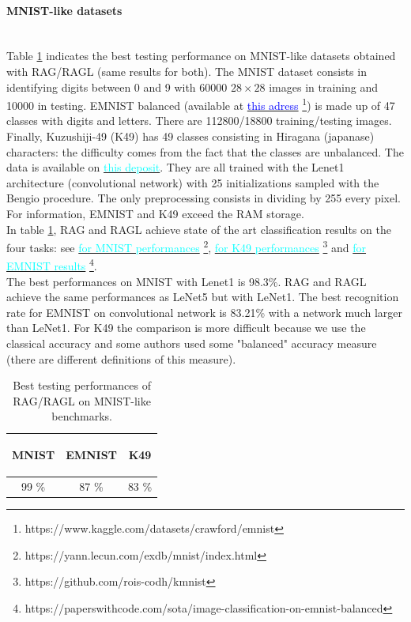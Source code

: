 \paragraph{MNIST-like datasets}
~~\\
Table \ref{MNIST_perf} indicates the best testing performance on MNIST-like datasets obtained with RAG/RAGL (same results for both). The MNIST dataset consists in identifying digits between 0 and 9 with 60000 $28\times 28$ images in training and 10000 in testing. %
EMNIST balanced (available at \href{https://www.kaggle.com/datasets/crawford/emnist}{\textcolor{blue}{this adress}} \footnote{https://www.kaggle.com/datasets/crawford/emnist}) is made up of 47 classes with digits and letters. There are 112800/18800 training/testing images. Finally, Kuzushiji-49 (K49) has 49 classes consisting in Hiragana (japanase) characters: the difficulty comes from the fact that the classes are unbalanced. The data is available on \href{https://github.com/rois-codh/kmnist}{\textcolor{cyan}{this deposit}}. They are all trained with the Lenet1 architecture \cite{LeNet1} (convolutional network) with 25 initializations sampled with the Bengio procedure. The only preprocessing consists in dividing by 255 every pixel. For information, EMNIST and K49 exceed the RAM storage. \\
In table \ref{MNIST_perf}, RAG and RAGL achieve state of the art classification results on the four tasks: see \href{https://yann.lecun.com/exdb/mnist/index.html}{\textcolor{cyan}{for MNIST performances}} \footnote{https://yann.lecun.com/exdb/mnist/index.html}, \href{https://github.com/rois-codh/kmnist}{\textcolor{cyan}{for K49 performances}} \footnote{https://github.com/rois-codh/kmnist} and \href{https://paperswithcode.com/sota/image-classification-on-emnist-balanced}{\textcolor{cyan}{for EMNIST results}} \footnote{https://paperswithcode.com/sota/image-classification-on-emnist-balanced}. \\
The best performances on MNIST with Lenet1 is 98.3\%. RAG and RAGL achieve the same performances as LeNet5 but with LeNet1. The best recognition rate for EMNIST on convolutional network is 83.21\% with a network much larger than LeNet1. For K49 the comparison is more difficult because we use the classical accuracy and some authors used some "balanced" accuracy measure (there are different definitions of this measure). 

\begin{table}[h!]
	\centering
	\begin{tabular}{ccc}
		\toprule
		\begin{bf} MNIST \end{bf} & \begin{bf}EMNIST\end{bf} & \begin{bf}K49\end{bf} \\ \midrule
		 99 \% & 87 \% & 83 \% \\ \bottomrule
	\end{tabular}
	\caption{Best testing performances of RAG/RAGL on MNIST-like benchmarks.}
	\label{MNIST_perf}
\end{table}


